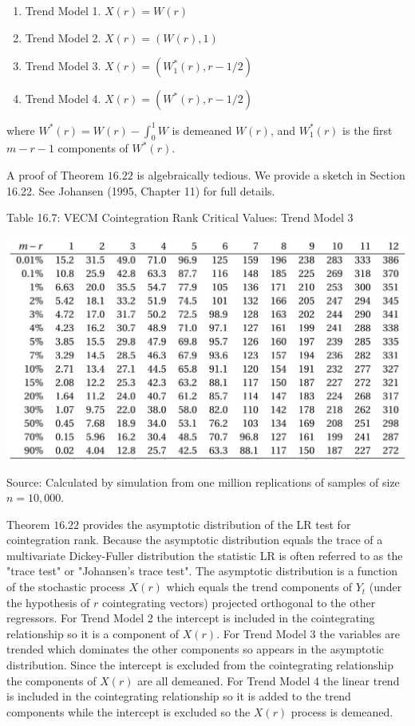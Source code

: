 \documentclass[10pt]{article}
\begin{document}
\begin{enumerate}
  \item Trend Model 1. $X(r)=W(r)$

  \item Trend Model 2. $X(r)=(W(r), 1)$

  \item Trend Model 3. $X(r)=\left(W_{1}^{*}(r), r-1 / 2\right)$

  \item Trend Model 4. $X(r)=\left(W^{*}(r), r-1 / 2\right)$

\end{enumerate}
where $W^{*}(r)=W(r)-\int_{0}^{1} W$ is demeaned $W(r)$, and $W_{1}^{*}(r)$ is the first $m-r-1$ components of $W^{*}(r)$.

A proof of Theorem $16.22$ is algebraically tedious. We provide a sketch in Section 16.22. See Johansen (1995, Chapter 11) for full details.

Table 16.7: VECM Cointegration Rank Critical Values: Trend Model 3

\includegraphics[max width=\textwidth]{2022_10_23_e99fc7c58db661c6f219g-41}

Source: Calculated by simulation from one million replications of samples of size $n=10,000$.

Theorem $16.22$ provides the asymptotic distribution of the LR test for cointegration rank. Because the asymptotic distribution equals the trace of a multivariate Dickey-Fuller distribution the statistic LR is often referred to as the "trace test" or "Johansen's trace test". The asymptotic distribution is a function of the stochastic process $X(r)$ which equals the trend components of $Y_{t}$ (under the hypothesis of $r$ cointegrating vectors) projected orthogonal to the other regressors. For Trend Model 2 the intercept is included in the cointegrating relationship so it is a component of $X(r)$. For Trend Model 3 the variables are trended which dominates the other components so appears in the asymptotic distribution. Since the intercept is excluded from the cointegrating relationship the components of $X(r)$ are all demeaned. For Trend Model 4 the linear trend is included in the cointegrating relationship so it is added to the trend components while the intercept is excluded so the $X(r)$ process is demeaned.
\end{document}
